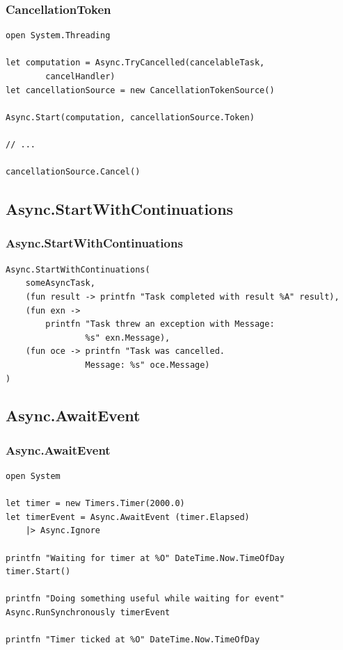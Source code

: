 \documentclass{../../slides-style}
\begin{document}
    \begin{frame}[fragile]
        \frametitle{CancellationToken}
        \begin{verbatim}
open System.Threading

let computation = Async.TryCancelled(cancelableTask, 
        cancelHandler)
let cancellationSource = new CancellationTokenSource()

Async.Start(computation, cancellationSource.Token)

// ...

cancellationSource.Cancel()
        \end{verbatim}
    \end{frame}

    \subsection{Async.StartWithContinuations}

    \begin{frame}[fragile]
        \frametitle{Async.StartWithContinuations}
        \begin{verbatim}
Async.StartWithContinuations(
    someAsyncTask,
    (fun result -> printfn "Task completed with result %A" result),
    (fun exn -> 
        printfn "Task threw an exception with Message: 
                %s" exn.Message),
    (fun oce -> printfn "Task was cancelled. 
                Message: %s" oce.Message)
)
        \end{verbatim}
    \end{frame}

    \subsection{Async.AwaitEvent}

    \begin{frame}[fragile]
        \frametitle{Async.AwaitEvent}
        \begin{verbatim}
open System

let timer = new Timers.Timer(2000.0)
let timerEvent = Async.AwaitEvent (timer.Elapsed) 
    |> Async.Ignore

printfn "Waiting for timer at %O" DateTime.Now.TimeOfDay
timer.Start()

printfn "Doing something useful while waiting for event"
Async.RunSynchronously timerEvent

printfn "Timer ticked at %O" DateTime.Now.TimeOfDay
        \end{verbatim}
    \end{frame}
\end{document}
